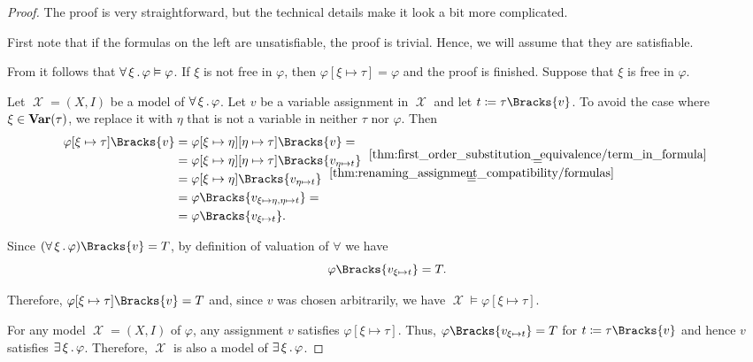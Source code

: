 \begin{proof}
  The proof is very straightforward, but the technical details make it look a bit more complicated.

  First note that if the formulas on the left are unsatisfiable, the proof is trivial. Hence, we will assume that they are satisfiable.

   From  it follows that \( \forall \thinspace \xi \thinspace . \thinspace \varphi \vDash \varphi \). If \( \xi \) is not free in \( \varphi \), then \( \varphi[\xi \mapsto \tau] = \varphi \) and the proof is finished. Suppose that \( \xi \) is free in \( \varphi \).

  Let \( \mscrX = (X, I) \) be a model of \( \forall \thinspace \xi \thinspace . \thinspace \varphi \). Let \( v \) be a variable assignment in \( \mscrX \) and let \( t \coloneqq \tau\Bracks{v} \). To avoid the case where \( \xi \in \operatorname{\mathbf{Var}}(\tau) \), we replace it with \( \eta \) that is not a variable in neither \( \tau \) nor \( \varphi \). Then
  \begin{align*}
    \varphi[\xi \mapsto \tau]\Bracks{v}
    &=
    \varphi[\xi \mapsto \eta][\eta \mapsto \tau]\Bracks{v}
    = \\ &=
    \varphi[\xi \mapsto \eta][\eta \mapsto \tau]\Bracks{v_{\eta \mapsto t}}
    \reloset {\ref{thm:first_order_substitution_equivalence/term_in_formula}} = \\ &=
    \varphi[\xi \mapsto \eta]\Bracks{v_{\eta \mapsto t}}
    \reloset {\ref{thm:renaming_assignment_compatibility/formulas}} = \\ &=
    \varphi\Bracks{v_{\xi \mapsto \eta, \eta \mapsto t}}
    = \\ &=
    \varphi\Bracks{v_{\xi \mapsto t}}.
  \end{align*}

  Since \( (\qforall \xi \varphi)\Bracks{v} = T \), by definition of valuation of \( \forall \) we have
  \begin{equation*}
    \varphi\Bracks{v_{\xi \mapsto t}} = T.
  \end{equation*}

  Therefore, \( \varphi[\xi \mapsto \tau]\Bracks{v} = T \) and, since \( v \) was chosen arbitrarily, we have \( \mscrX \vDash \varphi[\xi \mapsto \tau] \).

   For any model \( \mscrX = (X, I) \) of \( \varphi \), any assignment \( v \) satisfies \( \varphi[\xi \mapsto \tau] \). Thus, \( \varphi\Bracks{v_{\xi \mapsto t}} = T \) for \( t \coloneqq \tau\Bracks{v} \) and hence \( v \) satisfies \( \exists \thinspace \xi \thinspace . \thinspace \varphi \). Therefore, \( \mscrX \) is also a model of \( \exists \thinspace \xi \thinspace . \thinspace \varphi \).
\end{proof}

